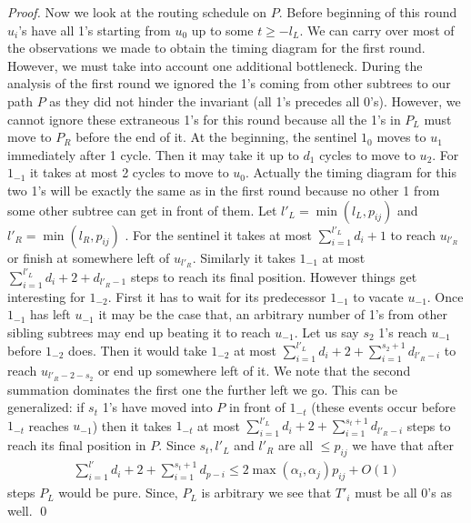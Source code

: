 \documentclass[runningheads,a4paper]{llncs}
\begin{document}
\begin{proof}
	
	
	Now we look at the routing schedule on $P$. Before beginning of this round $u_i$'s have all 1's starting from $u_0$ up to some $t \ge -l_L$. We can carry over most of the observations we made to obtain the timing diagram for the first round.  However, we must take into account one additional bottleneck. During the analysis of the first round we ignored the 1's coming from other subtrees to our path $P$ as they did not hinder the invariant (all 1's precedes all 0's). However, we cannot ignore these extraneous 1's for this round because all the 1's in $P_L$ must move to $P_R$ before the end of it. At the beginning, the sentinel $1_{0}$ moves to $u_1$ immediately after 1 cycle. Then it may take it up to $d_1$ cycles to move to $u_2$. For $1_{-1}$ it takes at most 2 cycles to move to $u_0$. Actually the timing diagram for this two 1's will be exactly the same as in the first round because no other 1 from some other subtree can get in front of them. Let $l'_L=\min(l_L,p_{ij})$ and $l'_R=\min(l_R,p_{ij})$ . For the sentinel it takes at most  $\sum_{i=1}^{l'_L}d_i+1$ to reach $u_{l'_R}$ or finish at somewhere left of $u_{l'_R}$. Similarly it takes $1_{-1}$ at most $\sum_{i=1}^{l'_L}d_i + 2 + d_{l'_R-1}$ steps to reach its final position.  
	However things get interesting for $1_{-2}$. First it has to wait for its predecessor $1_{-1}$ to vacate $u_{-1}$. Once $1_{-1}$ has left $u_{-1}$ it may be the case that, an arbitrary number of 1's from other sibling subtrees may end up beating it to reach $u_{-1}$. Let us say $s_{2}$  1's reach $u_{-1}$ before $1_{-2}$ does. Then it would take $1_{-2}$ at most $\sum_{i=1}^{l'_L}d_i + 2 + \sum_{i=1}^{s_{2}+1}d_{l'_R-i}$ to reach $u_{l'_R-2-s_2}$ or end up somewhere left of it. We note that the second summation dominates the first one the further left we go. This can be generalized: if $s_{t}$ 1's have moved into $P$ in front of $1_{-t}$ (these events occur before $1_{-t}$ reaches $u_{-1}$) then it takes $1_{-t}$ at most $\sum_{i=1}^{l'_L}d_i + 2 + \sum_{i=1}^{s_{t}+1}d_{l'_R-i}$ steps to reach its final position in $P$. Since $s_t, l'_L$ and $l'_R$ are all $\le p_{ij}$ we have that after
	\begin{align}
	\sum_{i=1}^{l'}d_i + 2 + \sum_{i=1}^{s_{t}+1}d_{p-i} \le 2\max(\alpha_i,\alpha_j) p_{ij} + O(1)
	\end{align}
	steps $P_L$ would be pure. Since, $P_L$ is arbitrary we see that $T'_i$ must be all 0's as well. \qed
\end{proof}
\end{document}
